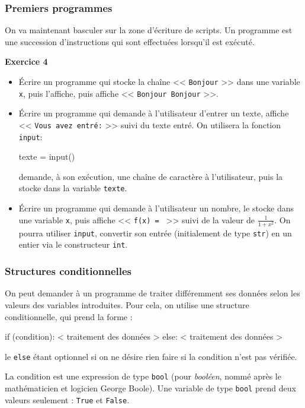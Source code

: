 \documentclass[10pt]{beamer}
\begin{document}
\begin{frame}[fragile]
	\frametitle{Premiers programmes}
	
	On va maintenant basculer sur la zone d'écriture de scripts. Un programme est une succession d'instructions qui sont effectuées lorsqu'il est exécuté.
	\pause
	
	\begin{block}{\textbf{Exercice 4}}
	\begin{itemize}[<+->]
	\item Écrire un programme qui stocke la chaîne << \verb|Bonjour| >> dans une variable \verb|x|, puis l'affiche, puis affiche << \verb|Bonjour Bonjour| >>.
	
	\item Écrire un programme qui demande à l'utilisateur d'entrer un texte, affiche << \verb|Vous avez entré:| >> suivi du texte entré. On utilisera la fonction \verb|input|:	\begin{semiverbatim}texte = input()\end{semiverbatim}
	demande, à son exécution, une chaîne de caractère à l'utilisateur, puis la stocke dans la variable \verb|texte|.
	
	\item Écrire un programme qui demande à l'utilisateur un nombre, le stocke dans une variable \verb|x|, puis affiche << \verb|f(x) = | >> suivi de la valeur de $\frac{1}{1+x^2}$. On pourra utiliser \verb|input|, convertir son entrée (initialement de type \verb|str|) en un entier via le constructeur \verb|int|.
	
	\end{itemize}
	\end{block}
	
\end{frame}

\begin{frame}[fragile]
	\frametitle{Structures conditionnelles}
	
	On peut demander à un programme de traiter différemment ses données selon les valeurs des variables introduites. Pour cela, on utilise une structure conditionnelle, qui prend la forme :
	\begin{semiverbatim}if (condition):
        < traitement des données >
    else:
        < traitement des données >\end{semiverbatim}
    le \verb|else| étant optionnel si on ne désire rien faire si la condition n'est pas vérifiée.
    
    La condition est une expression de type \verb|bool| (pour \textit{booléen}, nommé après le mathématicien et logicien George Boole). Une variable de type \verb|bool| prend deux valeurs seulement : \verb|True| et \verb|False|.
\end{frame}
\end{document}
